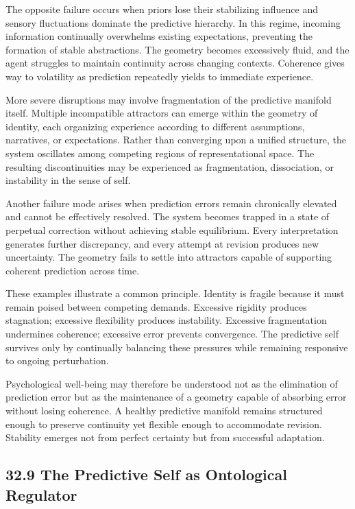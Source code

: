 \documentclass[12pt,letterpaper]{article}
\theoremstyle{remark}
\begin{document}
The opposite failure occurs when priors lose their stabilizing influence and sensory fluctuations dominate the predictive hierarchy. In this regime, incoming information continually overwhelms existing expectations, preventing the formation of stable abstractions. The geometry becomes excessively fluid, and the agent struggles to maintain continuity across changing contexts. Coherence gives way to volatility as prediction repeatedly yields to immediate experience.

More severe disruptions may involve fragmentation of the predictive manifold itself. Multiple incompatible attractors can emerge within the geometry of identity, each organizing experience according to different assumptions, narratives, or expectations. Rather than converging upon a unified structure, the system oscillates among competing regions of representational space. The resulting discontinuities may be experienced as fragmentation, dissociation, or instability in the sense of self.

Another failure mode arises when prediction errors remain chronically elevated and cannot be effectively resolved. The system becomes trapped in a state of perpetual correction without achieving stable equilibrium. Every interpretation generates further discrepancy, and every attempt at revision produces new uncertainty. The geometry fails to settle into attractors capable of supporting coherent prediction across time.

These examples illustrate a common principle. Identity is fragile because it must remain poised between competing demands. Excessive rigidity produces stagnation; excessive flexibility produces instability. Excessive fragmentation undermines coherence; excessive error prevents convergence. The predictive self survives only by continually balancing these pressures while remaining responsive to ongoing perturbation.

Psychological well-being may therefore be understood not as the elimination of prediction error but as the maintenance of a geometry capable of absorbing error without losing coherence. A healthy predictive manifold remains structured enough to preserve continuity yet flexible enough to accommodate revision. Stability emerges not from perfect certainty but from successful adaptation.

\subsection{32.9 The Predictive Self as Ontological Regulator}
\end{document}
